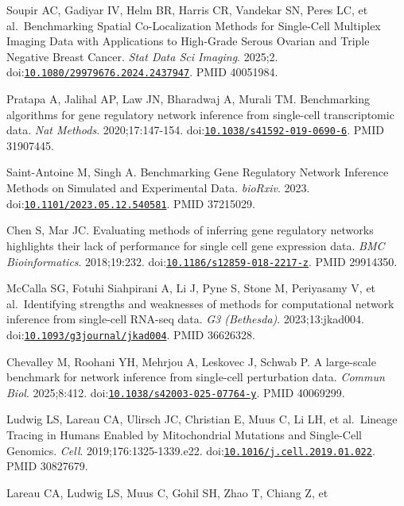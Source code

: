 \documentclass[11pt]{article}
\begin{document}
\begin{enumerate}[label={[\arabic*]},leftmargin=2.6em,labelsep=0.5em,itemsep=1.5pt]
  Soupir AC, Gadiyar IV, Helm BR, Harris CR, Vandekar SN, Peres LC, et
  al.~Benchmarking Spatial Co-Localization Methods for Single-Cell
  Multiplex Imaging Data with Applications to High-Grade Serous Ovarian
  and Triple Negative Breast Cancer. \emph{Stat Data Sci Imaging}.
  2025;2.
  doi:\href{https://doi.org/10.1080/29979676.2024.2437947}{\nolinkurl{10.1080/29979676.2024.2437947}}.
  PMID 40051984.
\item
  Pratapa A, Jalihal AP, Law JN, Bharadwaj A, Murali TM. Benchmarking
  algorithms for gene regulatory network inference from single-cell
  transcriptomic data. \emph{Nat Methods}. 2020;17:147-154.
  doi:\href{https://doi.org/10.1038/s41592-019-0690-6}{\nolinkurl{10.1038/s41592-019-0690-6}}.
  PMID 31907445.
\item
  Saint-Antoine M, Singh A. Benchmarking Gene Regulatory Network
  Inference Methods on Simulated and Experimental Data. \emph{bioRxiv}.
  2023.
  doi:\href{https://doi.org/10.1101/2023.05.12.540581}{\nolinkurl{10.1101/2023.05.12.540581}}.
  PMID 37215029.
\item
  Chen S, Mar JC. Evaluating methods of inferring gene regulatory
  networks highlights their lack of performance for single cell gene
  expression data. \emph{BMC Bioinformatics}. 2018;19:232.
  doi:\href{https://doi.org/10.1186/s12859-018-2217-z}{\nolinkurl{10.1186/s12859-018-2217-z}}.
  PMID 29914350.
\item
  McCalla SG, Fotuhi Siahpirani A, Li J, Pyne S, Stone M, Periyasamy V,
  et al.~Identifying strengths and weaknesses of methods for
  computational network inference from single-cell RNA-seq data.
  \emph{G3 (Bethesda)}. 2023;13:jkad004.
  doi:\href{https://doi.org/10.1093/g3journal/jkad004}{\nolinkurl{10.1093/g3journal/jkad004}}.
  PMID 36626328.
\item
  Chevalley M, Roohani YH, Mehrjou A, Leskovec J, Schwab P. A
  large-scale benchmark for network inference from single-cell
  perturbation data. \emph{Commun Biol}. 2025;8:412.
  doi:\href{https://doi.org/10.1038/s42003-025-07764-y}{\nolinkurl{10.1038/s42003-025-07764-y}}.
  PMID 40069299.
\item
  Ludwig LS, Lareau CA, Ulirsch JC, Christian E, Muus C, Li LH, et
  al.~Lineage Tracing in Humans Enabled by Mitochondrial Mutations and
  Single-Cell Genomics. \emph{Cell}. 2019;176:1325-1339.e22.
  doi:\href{https://doi.org/10.1016/j.cell.2019.01.022}{\nolinkurl{10.1016/j.cell.2019.01.022}}.
  PMID 30827679.
\item
  Lareau CA, Ludwig LS, Muus C, Gohil SH, Zhao T, Chiang Z, et

\end{enumerate}
\end{document}
